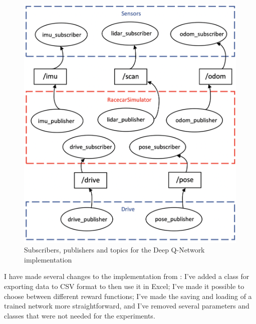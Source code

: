 \begin{figure}
\centering
\includegraphics[scale=0.33]{Figures/pub_sub.png}
\caption{Subscribers, publishers and topics for the Deep Q-Network implementation}
\label{pub_sub}
\end{figure}

I have made several changes to the implementation from \cite{bosello}: I've added a class for exporting data to CSV format to then use it in Excel; I've made it possible to choose between different reward functions; I've made the saving and loading of a trained network more straightforward, and I've removed several parameters and classes that were not needed for the experiments.
